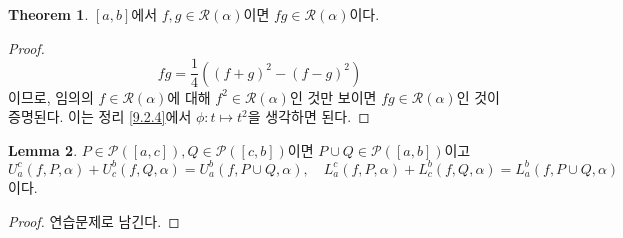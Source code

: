 \documentclass[11pt]{book}
\numberwithin{equation}{chapter}
\def\calP{\mathcal{P}}
\def\calR{\mathcal{R}}
\theoremstyle{definition}
\newtheorem{thm}{Theorem}[section]
\newtheorem{lem}[thm]{Lemma}
\begin{document}
\begin{thm} \label{9.3.5}
    \([a, b]\)에서 \(f, g \in \calR(\alpha)\)이면 \(fg \in \calR(\alpha)\)이다.
\end{thm}
\begin{proof}
    \[
        fg = \frac{1}{4}((f+g)^2 - (f-g)^2)
    \]
    이므로, 임의의 \(f \in \calR(\alpha)\)에 대해 \(f^2 \in \calR(\alpha)\)인 것만 보이면 \(fg \in \calR(\alpha)\)인 것이 증명된다. 이는 정리 \ref{9.2.4}에서 \(\phi : t \mapsto t^2\)을 생각하면 된다.
\end{proof}

\begin{lem} \label{9.3.4}
    \(P \in \calP([a, c]), Q \in \calP([c, b])\)이면 \(P \cup Q \in \calP([a, b])\)이고
    \[
        U_a^c(f, P, \alpha) + U_c^b(f, Q, \alpha) = U_a^b(f, P \cup Q, \alpha), \quad L_a^c(f, P, \alpha) + L_c^b(f, Q, \alpha) = L_a^b(f, P \cup Q, \alpha)
    \]
    이다.
\end{lem}
\begin{proof}
    연습문제로 남긴다.
\end{proof}
\end{document}
